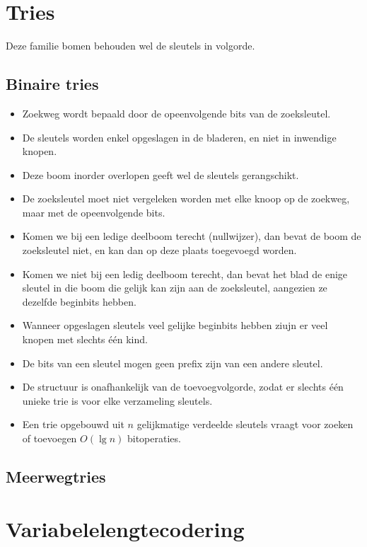 \documentclass{report}
\begin{document}
\section{Tries}
Deze familie bomen behouden wel de sleutels in volgorde.
\subsection{Binaire tries}
\begin{itemize}
	\item[\info] Zoekweg wordt bepaald door de opeenvolgende bits van de zoeksleutel.
	\item[\info] De sleutels worden enkel opgeslagen in de bladeren, en niet in inwendige knopen.
	\item[\good] Deze boom inorder overlopen geeft wel de sleutels gerangschikt.
	\item[\good] De zoeksleutel moet niet vergeleken worden met elke knoop op de zoekweg, maar met de opeenvolgende bits.  
	\item[\info] Komen we bij een ledige deelboom terecht (nullwijzer), dan bevat de boom de zoeksleutel niet, en kan dan op deze plaats toegevoegd worden.
	\item[\info] Komen we niet bij een ledig deelboom terecht, dan bevat het blad de enige sleutel in die boom die gelijk kan zijn aan de zoeksleutel, aangezien ze dezelfde beginbits hebben.
	\item[\alert] Wanneer opgeslagen sleutels veel gelijke beginbits hebben ziujn er veel knopen met slechts één kind.
	\item[\alert] De bits van een sleutel mogen geen prefix zijn van een andere sleutel. 
	\item[\good] De structuur is onafhankelijk van de toevoegvolgorde, zodat er slechts één unieke trie is voor elke verzameling sleutels.
	\item[\info] Een trie opgebouwd uit $n$ gelijkmatige verdeelde sleutels vraagt voor zoeken of toevoegen $O(\lg n)$ bitoperaties. 
\end{itemize}


\subsection{Meerwegtries}


\section{Variabelelengtecodering}
\end{document}
